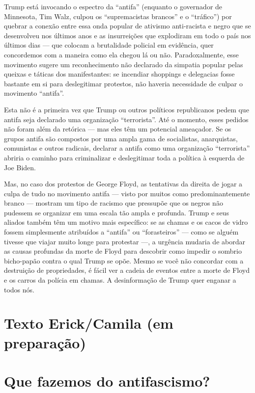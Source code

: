 Trump está invocando o espectro da “antifa” (enquanto o governador de Minnesota, Tim Walz, culpou os “supremacistas brancos” e o “tráfico”) por quebrar a conexão entre essa onda popular de ativismo anti-racista e negro que se desenvolveu nos últimos anos e as insurreições que explodiram em todo o país nos últimos dias — que colocam a brutalidade policial em evidência, quer concordemos com a maneira como ela chegou lá ou não. Paradoxalmente, esse movimento sugere um reconhecimento não declarado da simpatia popular pelas queixas e táticas dos manifestantes: se incendiar shoppings e delegacias fosse bastante em si para deslegitimar protestos, não haveria necessidade de culpar o movimento “antifa”.
 
Esta não é a primeira vez que Trump ou outros políticos republicanos pedem que antifa seja declarado uma organização “terrorista”. Até o momento, esses pedidos não foram além da retórica — mas eles têm um potencial ameaçador. Se os grupos antifa são compostos por uma ampla gama de socialistas, anarquistas, comunistas e outros radicais, declarar a antifa como uma organização “terrorista” abriria o caminho para criminalizar e deslegitimar toda a política à esquerda de Joe Biden.
 
Mas, no caso dos protestos de George Floyd, as tentativas da direita de jogar a culpa de tudo no movimento antifa — visto por muitos como predominantemente branco — mostram um tipo de racismo que pressupõe que os negros não pudessem se organizar em uma escala tão ampla e profunda. Trump e seus aliados também têm um motivo mais específico: se as chamas e os cacos de vidro fossem simplesmente atribuídos a “antifa” ou “forasteiros” — como se alguém tivesse que viajar muito longe para protestar —, a urgência mudaria de abordar as causas profundas da morte de Floyd para descobrir como impedir o sombrio bicho-papão contra o qual Trump se opõe. Mesmo se você não concordar com a destruição de propriedades, é fácil ver a cadeia de eventos entre a morte de Floyd e os carros da polícia em chamas. A desinformação de Trump quer enganar a todos nós.



\chapter{Texto Erick/Camila (em preparação)}

\lipsum[5]

\chapter{Que fazemos do antifascismo?}

